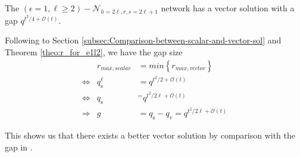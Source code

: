 \begin{cor}
The $\left(\epsilon=1,\ell\geq2\right)-\mathcal{N}_{h=2\ell,r,s=2\ell+1}$
network has a vector solution with a gap $q^{t^{2}/4+\mathcal{O}(t)}$.
\end{cor}
Following to Section \ref{subsec:Comparison-between-scalar-and-vector-sol}
and Theorem \ref{theo:r_for_e1l2}, we have the gap size 
\begin{eqnarray}
 & r_{max,scalar} & =min\left\{ r_{max,vector}\right\} \nonumber \\
\Leftrightarrow & q_{\mathrm{s}}^{\ell} & =q^{t^{2}/2+\mathcal{O}(t)}\nonumber \\
\Leftrightarrow & q_{\mathrm{s}} & ^{=}q^{t^{2}/2\ell+\mathcal{O}(t)}\nonumber \\
\Rightarrow & g & =q_{\mathrm{s}}-q_{v}=q^{t^{2}/2\ell+\mathcal{O}(t)}\label{eq:gap_e1l2}
\end{eqnarray}

This shows us that there exists a better vector solution by comparison
with the gap in \cite[Fig. 4]{Wachter-Zeh:2018}.

\clearpage